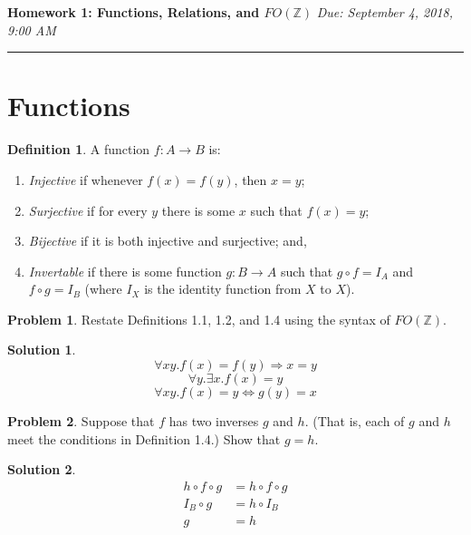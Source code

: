 \documentclass[10pt]{article}
\theoremstyle{definition}
\newtheorem{defn}{Definition}
\newtheorem{prob}{Problem}
\newtheorem{sol}{Solution}
\begin{document}
  
  \noindent
  \textbf{Homework 1: Functions, Relations, and $FO(\mathbb Z)$} \hfill \emph{Due: September 4, 2018, 9:00 AM}
  \hrule
  
  \vspace{.3in}
  
  \section*{Functions}
  
  \begin{defn}
    A function $f : A \to B$ is:
    \begin{enumerate}
    \item \emph{Injective} if whenever $f(x) = f(y)$, then $x = y$;
    \item \emph{Surjective} if for every $y$ there is some $x$ such that $f(x) = y$;
    \item \emph{Bijective} if it is both injective and surjective; and,
    \item \emph{Invertable} if there is some function $g : B \to A$ such that $g \circ f = I_A$ and
      $f \circ g = I_B$ (where $I_X$ is the identity function from $X$ to $X$).
    \end{enumerate}
  \end{defn}
  
  \begin{prob}
    Restate Definitions 1.1, 1.2, and 1.4 using the syntax of $FO(\mathbb Z)$.
  \end{prob}
  \begin{sol}
    \begin{equation}
        \forall xy.f(x) = f(y) \Rightarrow x = y
    \end{equation}
      \begin{equation}   
      \forall y. \exists x. f(x) = y
      \end{equation}
      \begin{equation}
        \forall xy. f(x) = y \Leftrightarrow g(y) = x
      \end{equation}
  \end{sol}
  
  \begin{prob}
    Suppose that $f$ has two inverses $g$ and $h$.  (That is, each of $g$ and $h$ meet the conditions
    in Definition 1.4.)  Show that $g = h$.
  \end{prob}
  \begin{sol}
      \begin{align}
      h \circ f \circ g &= h \circ f \circ g \\
    I_B \circ g &= h \circ I_B \\
      g &= h 
      \end{align}
  \end{sol}
  
\end{document}
